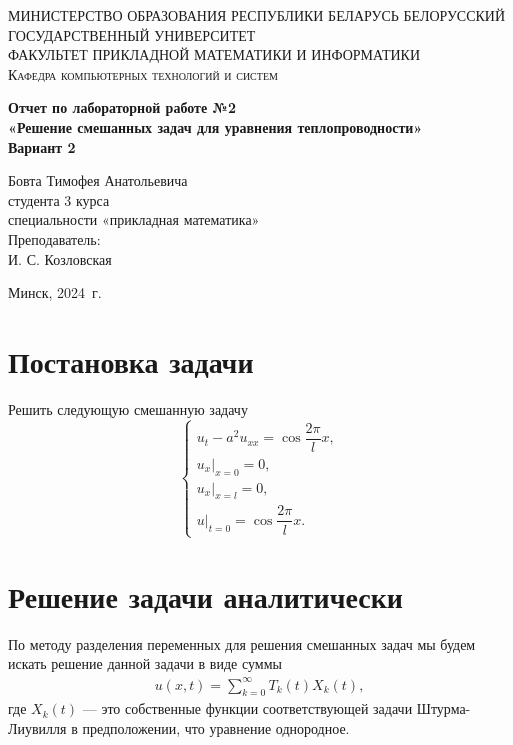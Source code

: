 \documentclass[a4paper, 12pt]{report}
\begin{document}
	\begin{titlepage}
		\begin{center}
			\textsc{МИНИСТЕРСТВО ОБРАЗОВАНИЯ РЕСПУБЛИКИ БЕЛАРУСЬ БЕЛОРУССКИЙ ГОСУДАРСТВЕННЫЙ УНИВЕРСИТЕТ
				\\[5mm]
				ФАКУЛЬТЕТ ПРИКЛАДНОЙ МАТЕМАТИКИ И ИНФОРМАТИКИ\\[2mm]
				Кафедра компьютерных технологий и систем
			}
			
			\vfill
			
			\textbf{Отчет по лабораторной работе №2\\
				«Решение смешанных задач для уравнения теплопроводности»\\
				Вариант 2
				\\[26mm]
			}
		\end{center}
		
		\hfill
		\begin{minipage}{.5\textwidth}
			\begin{flushright}
				Бовта Тимофея Анатольевича\\
				студента 3 курса\\
				специальности «прикладная математика»\\[5mm]
				
				Преподаватель:\\[2mm] 
				И. С. Козловская\\
			\end{flushright}
		\end{minipage}%
		\vfill
		\begin{center}
			Минск, 2024\ г.
		\end{center}
	\end{titlepage}
	\newpage
	\section*{Постановка задачи}
	Решить следующую смешанную задачу $$\begin{cases}
		u_t - a^2 u_{xx} = \cos\dfrac{2\pi}{l}x,\\
		u_x|_{x=0} = 0,\\
		u_x|_{x=l} = 0,\\
		u|_{t=0} = \cos\dfrac{2\pi}{l}x.
	\end{cases}$$
	\section*{Решение задачи аналитически}
	По методу разделения переменных для решения смешанных задач мы будем искать решение данной задачи в виде суммы 
	\begin{eqnarray}
		u(x,t) = \sum_{k=0}^{\infty} T_k(t)X_k(t),
	\end{eqnarray}
	где $X_k(t)$ --- это собственные функции соответствующей задачи Штурма-Лиувилля в предположении, что уравнение однородное.
\end{document}
